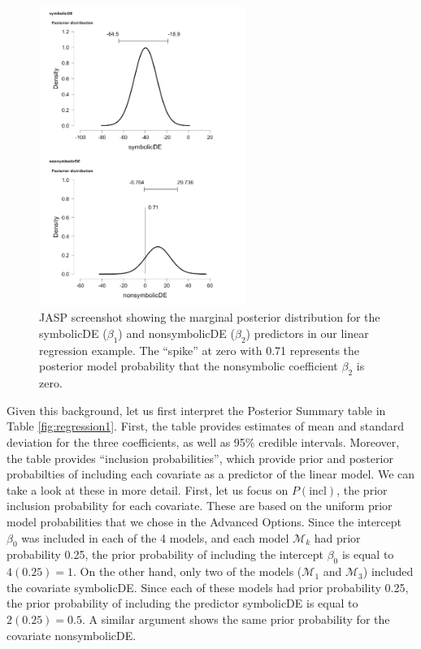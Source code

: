 \documentclass[english,,doc,floatsintext]{apa6}
\begin{document}
\begin{figure}[htbp]
\centering
\includegraphics[width=0.6\textwidth,height=\textheight]{figures/marginalPosterior.png}
\caption{\label{fig:marginalPosterior}JASP screenshot showing the marginal posterior distribution for the symbolicDE (\(\beta_1\)) and nonsymbolicDE (\(\beta_2\)) predictors in our linear regression example. The \enquote{spike} at zero with 0.71 represents the posterior model probability that the nonsymbolic coefficient \(\beta_2\) is zero.}
\end{figure}

Given this background, let us first interpret the Posterior Summary table in Table \ref{fig:regression1}. First, the table provides estimates of mean and standard deviation for the three coefficients, as well as 95\% credible intervals. Moreover, the table provides \enquote{inclusion probabilities}, which provide prior and posterior probabilties of including each covariate as a predictor of the linear model. We can take a look at these in more detail. First, let us focus on \(P(\text{incl})\), the prior inclusion probability for each covariate. These are based on the uniform prior model probabilities that we chose in the Advanced Options. Since the intercept \(\beta_{0}\) was included in each of the 4 models, and each model \(\mathcal{M}_{k}\) had prior probability 0.25, the prior probability of including the intercept \(\beta_{0}\) is equal to \(4(0.25) = 1\). On the other hand, only two of the models (\(\mathcal{M}_{1}\) and \(\mathcal{M}_{3}\)) included the covariate symbolicDE. Since each of these models had prior probability 0.25, the prior probability of including the predictor symbolicDE is equal to \(2(0.25) = 0.5\). A similar argument shows the same prior probability for the covariate nonsymbolicDE.
\end{document}
